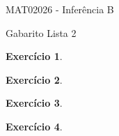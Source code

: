 \documentclass[letter,11pt]{article}
\newtheorem{exer}{Exercício}
\begin{document}
\begin{center}{ \Large MAT02026 - Inferência B }\end{center}

\begin{center}
{\large  \sc Gabarito Lista 2}
\end{center}
\vspace{5mm}

\begin{exer} \rm
\end{exer}


\begin{exer} \rm
% 
% 
% 
% 
% 
% 
\end{exer}


\begin{exer} \rm
\end{exer}


\begin{exer} \rm
\end{exer}
\end{document}
